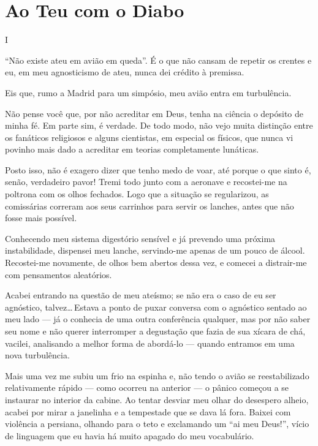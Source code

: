 \chapter{Ao Teu com o Diabo}


\begin{center}
{\Large I}
\end{center}

``Não existe ateu em avião em queda''. É o que não cansam de repetir os crentes e eu, em meu agnosticismo de ateu, nunca dei crédito à premissa.

Eis que, rumo a Madrid para um simpósio, meu avião entra em turbulência.

Não pense você que, por não acreditar em Deus, tenha na ciência o depósito de minha fé. Em parte sim, é verdade. De todo modo, não vejo muita distinção entre os fanáticos religiosos e alguns cientistas, em especial os físicos, que nunca vi povinho mais dado a acreditar em teorias completamente lunáticas.

Posto isso, não é exagero dizer que tenho medo de voar, até porque o que sinto é, senão, verdadeiro pavor! Tremi todo junto com a aeronave e recostei-me na poltrona com os olhos fechados. Logo que a situação se regularizou, as comissárias correram aos seus carrinhos para servir os lanches, antes que não fosse mais possível.

\begin{sloppypar}
Conhecendo meu sistema digestório sensível e já prevendo uma próxima instabilidade, dispensei meu lanche, servindo-me apenas de um pouco de álcool. Recostei-me novamente, de olhos bem abertos dessa vez, e comecei a distrair-me com pensamentos aleatórios.
\end{sloppypar}

Acabei entrando na questão de meu ateísmo; se não era o caso de eu ser agnóstico, talvez\ldots\,Estava a ponto de puxar conversa com o agnóstico sentado ao meu lado --- já o conhecia de uma outra conferência qualquer, mas por não saber seu nome e não querer interromper a degustação que fazia de sua xícara de chá, vacilei, analisando a melhor forma de abordá-lo --- quando entramos em uma nova turbulência.

Mais uma vez me subiu um frio na espinha e, não tendo o avião se reestabilizado relativamente rápido --- como ocorreu na anterior --- o pânico começou a se instaurar no interior da cabine. Ao tentar desviar meu olhar do desespero alheio, acabei por mirar a janelinha e a tempestade que se dava lá fora. Baixei com violência a persiana, olhando para o teto e exclamando um ``ai meu Deus!'', vício de linguagem que eu havia há muito apagado do meu vocabulário.


